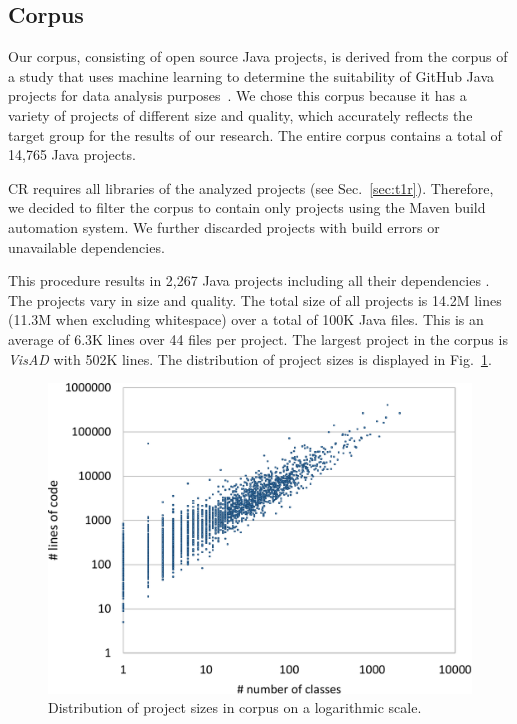 \documentclass[sigconf,review,anonymous]{acmart}
\begin{document}
\subsection{Corpus}
Our corpus, consisting of open source Java projects, is derived from the corpus of a study that uses machine learning to determine the suitability of GitHub Java projects for data analysis purposes~\cite{githubCorpus2013}. We chose this corpus because it has a variety of projects of different size and quality, which accurately reflects the target group for the results of our research. The entire corpus contains a total of 14,765 Java projects.

CR requires all libraries of the analyzed projects
(see Sec.~\ref{sec:t1r}). Therefore, we decided to filter the corpus to contain only projects using the Maven build automation system. We further discarded projects with build errors or unavailable dependencies. %

This procedure results in 2,267 Java projects including all their dependencies%
. The projects vary in size and quality. The total size of all projects is 14.2M lines (11.3M when excluding whitespace) over a total of 100K Java files. This is an average of 6.3K lines over 44 files per project. The largest project in the corpus is \textit{VisAD} with 502K lines. The distribution of project sizes is displayed in Fig.~\ref{fig:dist}.

\begin{figure}[H]
  \includegraphics[width=1\columnwidth]{img/dist2}
  \caption{Distribution of project sizes in corpus on a logarithmic scale.}
  \label{fig:dist}
\end{figure}
\end{document}
